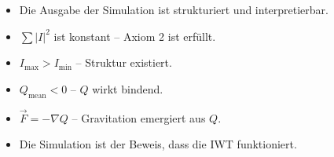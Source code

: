 \begin{itemize}
\item Die Ausgabe der Simulation ist strukturiert und interpretierbar.
\item \( \sum |I|^2 \) ist konstant – Axiom 2 ist erfüllt.
\item \( I_{\text{max}} > I_{\text{min}} \) – Struktur existiert.
\item \( Q_{\text{mean}} < 0 \) – \( Q \) wirkt bindend.
\item \( \vec{F} = -\nabla Q \) – Gravitation emergiert aus \( Q \).
\item Die Simulation ist der Beweis, dass die IWT funktioniert.
\end{itemize}